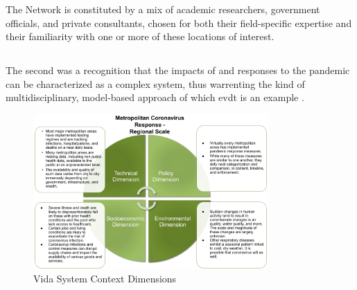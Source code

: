 The Network is constituted by a mix of academic researchers, government officials, and private consultants, chosen for both their field-specific expertise and their familiarity with one or more of these locations of interest.

\subsubsection{}

\subsubsection{}

\subsubsection{}

\subsubsection{}

\subsection{} \label{sec:vida-saf-result}

\subsubsection{}


The second was a recognition that the impacts of and responses to the pandemic can be characterized as a complex system, thus warrenting the kind of multidisciplinary, model-based approach of which \ac{evdt} is an example \cite{deweckHandlingCOVID192020}.

\begin{figure}[H] 
\centering
\includegraphics[width=0.8\textwidth]{Figures/chap5/dimensions_vida.png}
\caption[Vida System Context Dimensions]{Vida System Context Dimensions}
\label{fig:dimensions_vida}
\end{figure}


